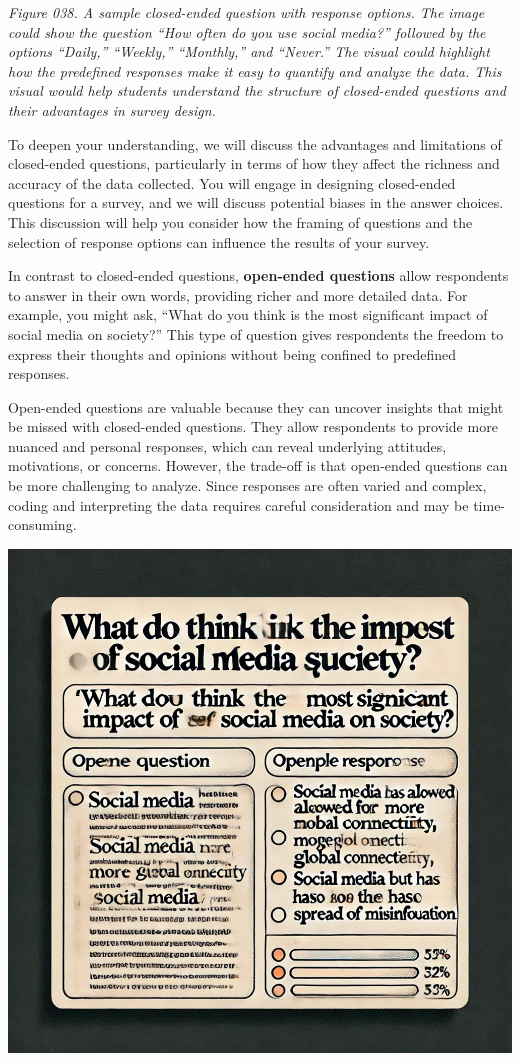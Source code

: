 \documentclass[
]{book}
\begin{document}
\emph{Figure 038. A sample closed-ended question with response options. The image could show the question ``How often do you use social media?'' followed by the options ``Daily,'' ``Weekly,'' ``Monthly,'' and ``Never.'' The visual could highlight how the predefined responses make it easy to quantify and analyze the data. This visual would help students understand the structure of closed-ended questions and their advantages in survey design.}

To deepen your understanding, we will discuss the advantages and limitations of closed-ended questions, particularly in terms of how they affect the richness and accuracy of the data collected. You will engage in designing closed-ended questions for a survey, and we will discuss potential biases in the answer choices. This discussion will help you consider how the framing of questions and the selection of response options can influence the results of your survey.

In contrast to closed-ended questions, \textbf{open-ended questions} allow respondents to answer in their own words, providing richer and more detailed data. For example, you might ask, ``What do you think is the most significant impact of social media on society?'' This type of question gives respondents the freedom to express their thoughts and opinions without being confined to predefined responses.

Open-ended questions are valuable because they can uncover insights that might be missed with closed-ended questions. They allow respondents to provide more nuanced and personal responses, which can reveal underlying attitudes, motivations, or concerns. However, the trade-off is that open-ended questions can be more challenging to analyze. Since responses are often varied and complex, coding and interpreting the data requires careful consideration and may be time-consuming.

\includegraphics[width=1\textwidth,height=\textheight]{images/fig039.jpg}
\end{document}
